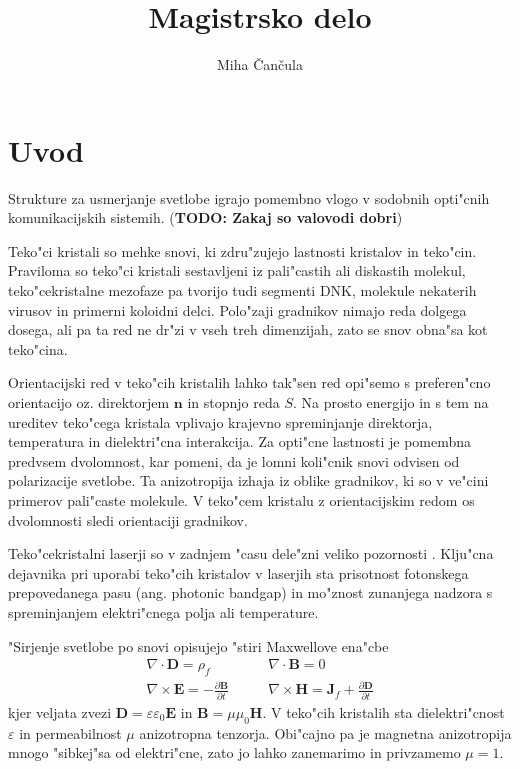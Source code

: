 \documentclass[a4paper,10pt]{article}
\title{Magistrsko delo}
\author{Miha \v Can\v cula}
\newcommand{\todo}[1]{(\textbf{\textsc{TODO}: #1})}
\newcommand{\odvod}[2]{\frac{\partial #1}{\partial #2}}
\renewcommand{\vec}{\mathbf}
\begin{document}
\maketitle

\section{Uvod} %

Strukture za usmerjanje svetlobe igrajo pomembno vlogo v sodobnih opti"cnih komunikacijskih sistemih\cite{ruetschi-1994}. 
\todo{Zakaj so valovodi dobri}




Teko"ci kristali so mehke snovi, ki zdru"zujejo lastnosti kristalov in teko"cin\cite{degennes}. 
Praviloma so teko"ci kristali sestavljeni iz pali"castih ali diskastih molekul, teko"cekristalne mezofaze pa tvorijo tudi segmenti DNK, molekule nekaterih virusov in primerni koloidni delci. 
Polo"zaji gradnikov nimajo reda dolgega dosega, ali pa ta red ne dr"zi v vseh treh dimenzijah, zato se snov obna"sa kot teko"cina. 

Orientacijski red v teko"cih kristalih lahko tak"sen red opi"semo s preferen"cno orientacijo oz. direktorjem $\mathbf{n}$ in stopnjo reda $S$. 
Na prosto energijo in s tem na ureditev teko"cega kristala vplivajo krajevno spreminjanje direktorja, temperatura in dielektri"cna interakcija. 
Za opti"cne lastnosti je pomembna predvsem dvolomnost, kar pomeni, da je lomni koli"cnik snovi odvisen od polarizacije svetlobe. 
Ta anizotropija izhaja iz oblike gradnikov, ki so v ve"cini primerov pali"caste molekule. 
V teko"cem kristalu z orientacijskim redom os dvolomnosti sledi orientaciji gradnikov. 


Teko"cekristalni laserji so v zadnjem "casu dele"zni veliko pozornosti \cite{coles-morris, humar-musevic, humar-ravnik}. 
Klju"cna dejavnika pri uporabi teko"cih kristalov v laserjih sta prisotnost fotonskega prepovedanega pasu (ang. photonic bandgap) in mo"znost zunanjega nadzora s spreminjanjem elektri"cnega polja ali temperature.

"Sirjenje svetlobe po snovi opisujejo "stiri Maxwellove ena"cbe
\begin{equation}
\begin{aligned}
 \nabla \cdot \vec D = \rho_f & \qquad \nabla \cdot \vec B = 0 \\
 \nabla \times \vec E = -\odvod{\vec B}{t} & \qquad \nabla \times \vec H = \vec J_f + \odvod{\vec D}{t}
\end{aligned} 
\end{equation}
kjer veljata zvezi $\vec D = \varepsilon \varepsilon_0 \vec E$ in $\vec B = \mu \mu_0 \vec H$. 
V teko"cih kristalih sta dielektri"cnost $\varepsilon$ in permeabilnost $\mu$ anizotropna tenzorja. 
Obi"cajno pa je magnetna anizotropija mnogo "sibkej"sa od elektri"cne, zato jo lahko zanemarimo in privzamemo $\mu = 1$. 
\end{document}
